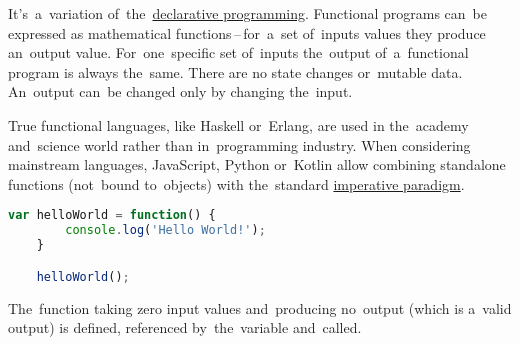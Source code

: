 It's~a~variation of~the~\hyperref[declarativeprogramming]{declarative programming}. Functional programs can~be expressed as mathematical functions\,--\,for~a~set of~inputs values they produce an~output value. For~one~specific set of~inputs the~output of~a~functional program is always the~same. There are no state changes or~mutable data. An~output can~be changed only by changing the~input.

True functional languages, like Haskell or~Erlang, are used in the~academy and~science world rather than in~programming industry. When considering mainstream languages, JavaScript, Python or~Kotlin allow combining standalone functions (not~bound to~objects) with the~standard \hyperref[imperativeprogramming]{imperative paradigm}.

\begin{lstlisting}[language=JavaScript]
    var helloWorld = function() {
        console.log('Hello World!');
    }

    helloWorld();
\end{lstlisting}

\noindent The~function taking zero input values and~producing no~output (which is a~valid output) is defined, referenced by~the~variable and~called.

